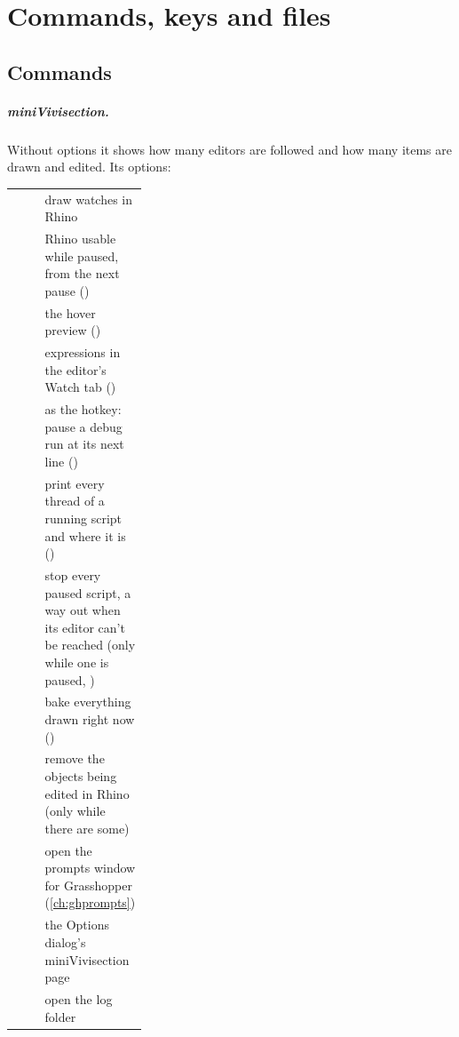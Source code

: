 \chapter{Commands, keys and files}\label{ch:reference}

\section{Commands}\label{sec:commands}

\paragraph{miniVivisection.} Without options it shows how many editors are followed and how many items are drawn and
edited. Its options:

\begin{xltabular}{\linewidth}{@{}P{0.3\linewidth}L@{}}
\toprule
{}             & draw watches in Rhino \\
        & Rhino usable while paused, from the next pause () \\
     & the hover preview () \\
 & expressions in the editor's Watch tab () \\
                & as the hotkey: pause a debug run at its next line () \\
         & print every thread of a running script and where it is () \\
              & stop every paused script, a way out when its editor can't be reached (only while one is paused, ) \\
                 & bake everything drawn right now () \\
             & remove the objects being edited in Rhino (only while there are some) \\
      & open the prompts window for Grasshopper (\cref{ch:ghprompts}) \\
                & the Options dialog's miniVivisection page \\
               & open the log folder \\
\bottomrule
\end{xltabular}

